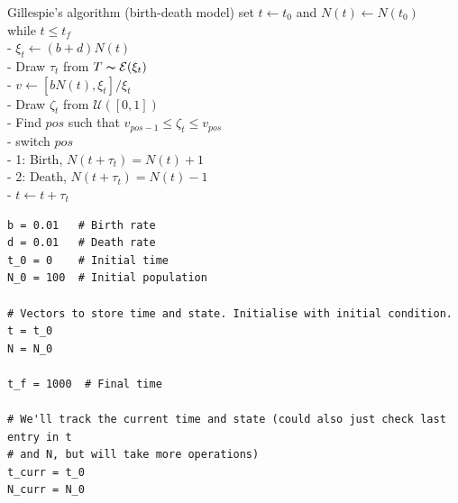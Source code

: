 \documentclass[aspectratio=43]{beamer}
\begin{document}
\begin{frame}{Gillespie's algorithm (birth-death model)}
set $t\leftarrow t_0$ and $N(t)\leftarrow N(t_0)$\\
while {$t\leq t_f$}\\
- $\xi_t\leftarrow (b+d)N(t)$\\
- Draw $\tau_t$ from $T\thicksim \mathcal{E}(\xi_t)$\\
- $v\leftarrow\left[bN(t),\xi_t\right]/\xi_t$\\
- Draw $\zeta_t$ from $\mathcal{U}([0,1])$\\
- Find $pos$ such that $v_{pos-1}\leq\zeta_t\leq v_{pos}$\\
- switch {$pos$}\\
\qquad - 1: Birth, $N(t+\tau_t)=N(t)+1$ \\
\qquad - 2: Death, $N(t+\tau_t)=N(t)-1$ \\
- $t\leftarrow t+\tau_t$    
\end{frame}

% 
% 
% 

\begin{frame}[fragile]
\begin{lstlisting}[language=Renhanced]
b = 0.01   # Birth rate
d = 0.01   # Death rate
t_0 = 0    # Initial time
N_0 = 100  # Initial population

# Vectors to store time and state. Initialise with initial condition.
t = t_0
N = N_0

t_f = 1000  # Final time

# We'll track the current time and state (could also just check last entry in t
# and N, but will take more operations)
t_curr = t_0
N_curr = N_0
\end{lstlisting}
\end{frame}
\end{document}
